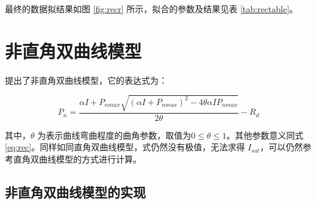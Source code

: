\documentclass[]{krantz}
\theoremstyle{definition}
\theoremstyle{definition}
\theoremstyle{definition}
\theoremstyle{remark}
\begin{document}
最终的数据拟结果如图 \ref{fig:recr} 所示，拟合的参数及结果见表
\ref{tab:rectable}。

\cleardoublepage

\section{非直角双曲线模型}\label{nonrec_mod}

\citet{Thornley1976} 提出了非直角双曲线模型，它的表达式为：

\begin{equation}
P_{n} = \frac{\alpha I + P_{nmax} \sqrt{(\alpha I + P_{nmax})^{2} - 4  \theta \alpha I P_{nmax}}}{2 \theta} - R_{d}
\label{eq:nrec}
\end{equation}

其中，\(\theta\)
为表示曲线弯曲程度的曲角参数，取值为\(0\leq \theta \leq 1\)。其他参数意义同式
\eqref{eq:rec}。同样如同直角双曲线模型，式仍然没有极值，无法求得
\(I_{sat}\)，可以仍然参考直角双曲线模型的方式进行计算。

\subsection{非直角双曲线模型的实现}\label{nonrec_mode_exam}
\end{document}
